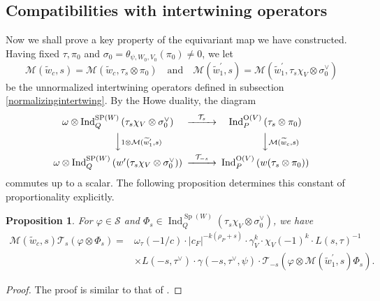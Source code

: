 \documentclass[article]{article}
\numberwithin{equation}{section}
\newtheorem{proposition}[theorem]{Proposition}
\theoremstyle{definition}
\DeclareMathOperator{\Ind}{Ind}
\DeclareMathOperator{\SP}{Sp}
\begin{document}
\subsection{Compatibilities with intertwining operators}
Now we shall prove a key property of the equivariant map we have constructed. Having fixed $\tau,\pi_0$ and $\sigma_0 =\theta_{\psi, W_0, V_0}(\pi_0) \neq 0$, we let  
$$\mathcal{M}(\widetilde{w}_c, s)=\mathcal{M}\left(\widetilde{w}_c, \tau_{s} \otimes \pi_0\right) \quad \mbox{and} \quad \mathcal{M}\left(\widetilde{w}_1^{\prime}, s\right)=\mathcal{M}\left(\widetilde{w}_1^\prime, \tau_{s}\chi_{V} \otimes \sigma_{0}^{\vee}\right)$$
be the unnormalized intertwining operators defined in subsection \ref{normalizingintertwing}. By the Howe duality, the diagram 
$$
\begin{CD}
\omega \otimes \operatorname{Ind}_{Q}^{\mathrm{SP}\left(W\right)}\left(\tau_{s}\chi_{V} \otimes \sigma_{0}^{\vee}\right) @>\mathcal T_{s}>> \operatorname{Ind}_{P}^{\mathrm{O}\left(V\right)}\left(\tau_{s}  \otimes \pi_0\right)\\
@VV1\otimes\mathcal{M}(\widetilde{w}_1^{\prime}, s) V @VV\mathcal{M}(\widetilde{w}_c, s)V\\
\omega \otimes \operatorname{Ind}_{Q}^{\mathrm{SP}\left(W\right)}\left(w^{\prime}(\tau_{s}\chi_{V} \otimes \sigma_{0}^{\vee})\right) @>\mathcal T_{-s}>> \operatorname{Ind}_{P}^{\mathrm{O}\left(V\right)}\left(w(\tau_{s} \otimes \pi_0)\right) 
\end{CD}
$$
commutes up to a scalar. The following proposition determines this constant of proportionality explicitly.
\begin{proposition}\label{commuteunnormalize}
	For $\varphi\in \mathscr S $ and $\Phi_{s}\in \Ind_{Q}^{\SP(W)}(\tau_s\chi_{V}\otimes \sigma_{0}^{\vee})$, we have 
	\begin{align*}
	\mathcal{M}\left(\widetilde{w}_c, s\right) \mathcal{T}_{s}\left(\varphi\otimes \Phi_{s}\right)=& \omega_{\tau}(-1/c) \cdot | c_{F}|^{-k(\rho_P+s)} \cdot \gamma_{V}^{k} \cdot\chi_{V}(-1)^{k}\cdot L(s, \tau)^{-1}\\& \times L\left(-s, \tau^{\vee}\right)\cdot\gamma\left(-s, \tau^{\vee}, \psi\right) 
	\cdot \mathcal{T}_{-s}\left(\varphi\otimes \mathcal{M}(\widetilde{w}_1^{\prime}, s) \Phi_{s}\right). 
	\end{align*}
 \end{proposition}
\begin{proof}
	The proof is similar to that of \cite[Proposition 8.4]{MR3573972}. 
\end{proof}	
\end{document}
